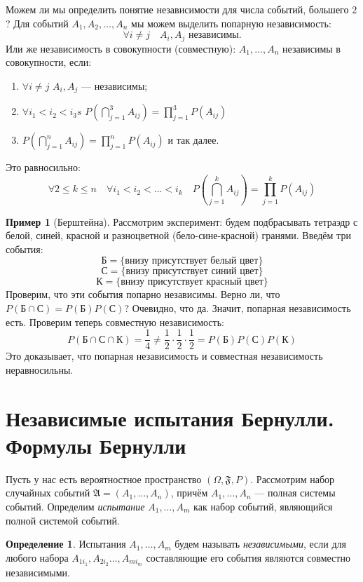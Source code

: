 \documentclass[11pt,openany,a4paper]{scrartcl}
\theoremstyle{plain}
\theoremstyle{definition}
\newtheorem{definition}[theorem]{Определение}
\newtheorem{example}[theorem]{Пример}
\begin{document}
Можем ли мы определить понятие независимости для числа событий, большего $2$?
Для событий $A_1, A_2, \ldots, A_n$ мы можем выделить попарную независимость:
$$
\forall i\neq j\quad A_i, A_j \text{ независимы.}
$$
Или же независимость в совокупности (совместную): $A_1, \ldots, A_n$ независимы в
совокупности, если:
\begin{enumerate}
    \item $\forall i\neq j$ $A_i, A_j$ — независимы;
    \item $\forall i_1<i_2<i_3s$ $P(\bigcap_{j=1}^3 A_{ij}) = \prod_{j=1}^3P(A_{ij})$
    \item $P(\bigcap_{j=1}^n A_{ij}) = \prod_{j=1}^n P(A_{ij})$ и так далее.
\end{enumerate}
Это равносильно:
$$
\forall 2 \leqslant k \leqslant n \quad \forall i_1 < i_2 < \ldots < i_k\quad
P(\bigcap_{j=1}^k A_{ij}) = \prod_{j=1}^k P(A_{ij})
$$

\begin{example}[Берштейна]
    Рассмотрим эксперимент: будем подбрасывать тетраэдр с белой, синей, красной и 
    разноцветной (бело-сине-красной) гранями. Введём три события:
    $$Б = \{\text{внизу присутствует белый цвет}\}$$
    $$С = \{\text{внизу присутствует синий цвет}\}$$
    $$К = \{\text{внизу присутствует красный цвет}\}$$
    Проверим, что эти события попарно независимы. Верно ли, что
    $P(Б \cap С) = P(Б)P(С)$? Очевидно, что да. Значит, попарная независимость есть.
    Проверим теперь совместную независимость:
    $$
    P(Б\cap С\cap К) = \frac{1}{4} \neq \frac{1}{2} \cdot\frac{1}{2} \cdot\frac{1}{2} =
    P(Б)P(С)P(К)
    $$
    Это доказывает, что попарная независимость и совместная независимость 
    неравносильны.
\end{example}

\section{Независимые испытания Бернулли. Формулы Бернулли}

Пусть у нас есть вероятностное пространство $(\Omega, \mathfrak{F}, P)$.
Рассмотрим набор случайных событий $\mathfrak A = (A_1, \ldots, A_n)$,
причём $A_1, \ldots, A_n$ — полная системы событий. Определим \emph{испытание}
$A_1, \ldots, A_m$ как 
набор событий, являющийся полной системой событий.

\begin{definition}
    Испытания $A_1, \ldots, A_m$ будем называть \emph{независимыми}, если для любого
    набора $A_{1i_1}, A_{2i_2} \ldots, A_{mi_m}$ составляющие его события являются
    совместно независимыми.
\end{definition}
\end{document}
